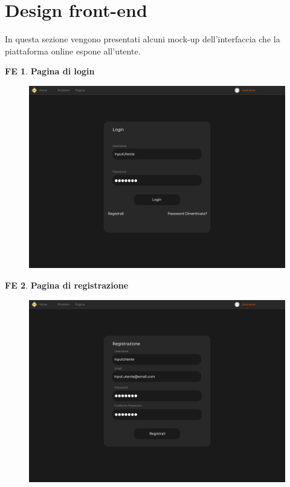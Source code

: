 \documentclass[11pt, a4paper]{article}
\theoremstyle{definition}
\newtheorem{frontend}{FE}
\begin{document}
\newpage
\section{Design front-end}
In questa sezione vengono presentati alcuni mock-up dell'interfaccia che
la piattaforma online espone all'utente.

\begin{frontend}
\textbf{Pagina di login }
\end{frontend}
\begin{figure}[H]
\centering
\includegraphics[scale=0.22]{materiale/immaginife/login.jpeg}
\end{figure}

\begin{frontend}
\textbf{Pagina di registrazione }
\end{frontend}
\begin{figure}[H]
\centering
\includegraphics[scale=0.22]{materiale/immaginife/registrazione.jpeg}
\end{figure}
\end{document}
